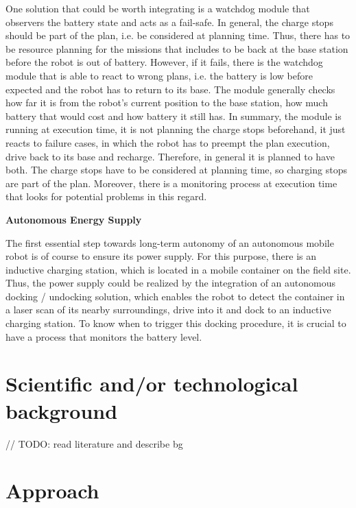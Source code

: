 \documentclass[german, master, expose, latin1]{base/thesis_KBS}
\begin{document}
One solution that could be worth integrating is a watchdog module that observers the battery state and acts as a fail-safe. In general, the charge stops should
be part of the plan, i.e. be considered at planning time. Thus, there has to be resource planning for the missions that includes to be back at the base station before
the robot is out of battery. However, if it fails, there is the watchdog module that is able to react to wrong plans, i.e. the battery is low before expected and the 
robot has to return to its base. The module generally checks how far it is from the robot's current position to the base station, how much battery that would cost and
how battery it still has. In summary, the module is running at execution time, it is not planning the charge stops beforehand, it just reacts to failure cases, in which 
the robot has to preempt the plan execution, drive back to its base and recharge. Therefore, in general it is planned to have both. The charge stops have to be considered 
at planning time, so charging stops are part of the plan. Moreover, there is a monitoring process at execution time that looks for potential problems in this regard.\newline

\textbf{Autonomous Energy Supply}\newline

The first essential step towards long-term autonomy of an autonomous mobile robot is of course to ensure its power supply.
For this purpose, there is an inductive charging station, which is located in a mobile container on the field site.
Thus, the power supply could be realized by the integration of an autonomous docking / undocking solution, which enables the robot to detect
the container in a laser scan of its nearby surroundings, drive into it and dock to an inductive charging station.
To know when to trigger this docking procedure, it is crucial to have a process that monitors the battery level.\newline

\section{Scientific and/or technological background}

// TODO: read literature and describe bg

\section{Approach}
\end{document}
